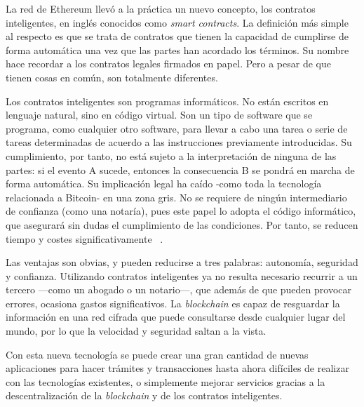   La red de Ethereum llevó a la práctica un nuevo concepto, los contratos inteligentes, en inglés conocidos como \textit{smart contracts}. 
  La definición más simple al respecto es que se trata de contratos que tienen la capacidad de cumplirse de forma automática una vez que 
  las partes han acordado los términos. Su nombre hace recordar a los contratos legales firmados en papel. Pero a pesar de que tienen 
  cosas en común, son totalmente diferentes. 

  Los contratos inteligentes son programas informáticos. No están escritos en lenguaje natural, sino en código virtual. Son un 
  tipo de software que se programa, como cualquier otro software, para llevar a cabo una tarea o serie de tareas determinadas de acuerdo a 
  las instrucciones previamente introducidas. Su cumplimiento, por tanto, no está sujeto a la interpretación de ninguna de las partes: si 
  el evento A sucede, entonces la consecuencia B se pondrá en marcha de forma automática. Su implicación legal ha caído -como toda la 
  tecnología relacionada a Bitcoin- en una zona gris. No se requiere de ningún intermediario de confianza (como una notaría), pues este 
  papel lo adopta el código informático, que asegurará sin dudas el cumplimiento de las condiciones. Por tanto, se reducen tiempo y costes 
  significativamente ~\parencite{smartcontract}. 


  Las ventajas son obvias, y pueden reducirse a tres palabras: autonomía, seguridad y confianza. Utilizando contratos inteligentes ya no 
  resulta necesario recurrir a un tercero —como un abogado o un notario—, que además de que pueden provocar errores, ocasiona gastos 
  significativos. La \textit{blockchain} es capaz de resguardar la información en una red cifrada que puede consultarse desde cualquier lugar del 
  mundo, por lo que la velocidad y seguridad saltan a la vista.

  Con esta nueva tecnología se puede crear una gran cantidad de nuevas aplicaciones para hacer trámites y transacciones hasta ahora
  difíciles de realizar con las tecnologías existentes, o simplemente mejorar servicios gracias a la descentralización
  de la \textit{blockchain} y de los contratos inteligentes.

